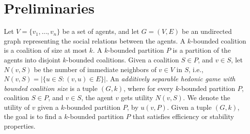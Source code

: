 \documentclass[sigconf]{aamas}
\begin{document}

%

%

\section{Preliminaries}
Let $V=\{v_1, ..., v_n\}$ be a set of agents, and let $G=(V,E)$ be an undirected graph representing the social relations between the agents. 
A $k$-bounded coalition is a coalition of size at most $k$. A $k$-bounded partition $P$ is a partition of the agents into disjoint $k$-bounded coalitions. Given a coalition $S \in P$, and $v\in S$, let $N(v,S)$ be the number of immediate neighbors of $v \in V$ in $S$, i.e., $N(v,S) = |\{u \in S : (v,u) \in E\}|$.
An \textit{additively separable hedonic game with bounded coalition size} is a tuple $(G,k)$, where for every $k$-bounded partition $P$, coalition $S \in P$, and $v \in S$, the agent $v$ gets utility $N(v,S)$. We denote the utility of $v$ given a $k$-bounded partition $P$, by $u(v,P)$. Given a tuple $(G,k)$, the goal is to find a $k$-bounded partition $P$ that satisfies efficiency or stability properties.
\end{document}
